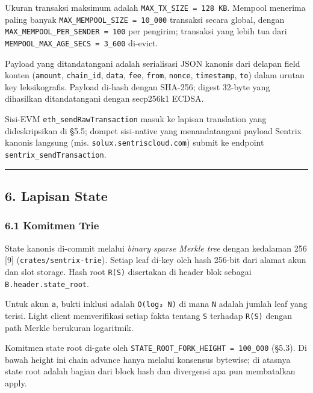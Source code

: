 \documentclass[11pt,a4paper]{article}
\begin{document}
Ukuran transaksi maksimum adalah \texttt{MAX\_TX\_SIZE\ =\ 128\ KB}. Mempool menerima paling banyak \texttt{MAX\_MEMPOOL\_SIZE\ =\ 10\_000} transaksi secara global, dengan \texttt{MAX\_MEMPOOL\_PER\_SENDER\ =\ 100} per pengirim; transaksi yang lebih tua dari \texttt{MEMPOOL\_MAX\_AGE\_SECS\ =\ 3\_600} di-evict.

Payload yang ditandatangani adalah serialisasi JSON kanonis dari delapan field konten (\texttt{amount}, \texttt{chain\_id}, \texttt{data}, \texttt{fee}, \texttt{from}, \texttt{nonce}, \texttt{timestamp}, \texttt{to}) dalam urutan key leksikografis. Payload di-hash dengan SHA-256; digest 32-byte yang dihasilkan ditandatangani dengan secp256k1 ECDSA.

Sisi-EVM \texttt{eth\_sendRawTransaction} masuk ke lapisan translation yang dideskripsikan di §5.5; dompet sisi-native yang menandatangani payload Sentrix kanonis langsung (mis. \texttt{solux.sentriscloud.com}) submit ke endpoint \texttt{sentrix\_sendTransaction}.

\begin{center}\rule{0.5\linewidth}{0.5pt}\end{center}

\hypertarget{lapisan-state}{%
\subsection{6. Lapisan State}\label{lapisan-state}}

\hypertarget{komitmen-trie}{%
\subsubsection{6.1 Komitmen Trie}\label{komitmen-trie}}

State kanonis di-commit melalui \emph{binary sparse Merkle tree} dengan kedalaman 256 {[}9{]} (\texttt{crates/sentrix-trie}). Setiap leaf di-key oleh hash 256-bit dari alamat akun dan slot storage. Hash root \texttt{R(S)} disertakan di header blok sebagai \texttt{B.header.state\_root}.

Untuk akun \texttt{a}, bukti inklusi adalah \texttt{O(log₂\ N)} di mana \texttt{N} adalah jumlah leaf yang terisi. Light client memverifikasi setiap fakta tentang \texttt{S} terhadap \texttt{R(S)} dengan path Merkle berukuran logaritmik.

Komitmen state root di-gate oleh \texttt{STATE\_ROOT\_FORK\_HEIGHT\ =\ 100\_000} (§5.3). Di bawah height ini chain advance hanya melalui konsensus bytewise; di atasnya state root adalah bagian dari block hash dan divergensi apa pun membatalkan apply.
\end{document}
